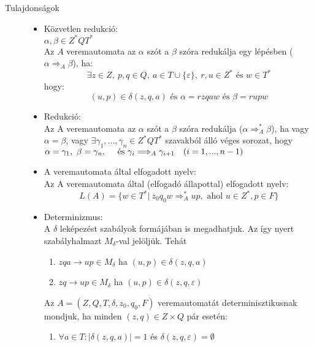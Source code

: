 \documentclass[margin=0px]{article}
\begin{document}
\begin{description}
    \item[Tulajdonságok] \hfill
        \begin{itemize}
            \item Közvetlen redukció: \\
                  $\alpha, \beta \in Z^*QT^*$\\
                  Az $A$ veremautomata az $\alpha $ szót a $\beta$ szóra redukálja egy lépésben ($\alpha \Longrightarrow_A \beta$), ha:
                  \[\exists z \in Z, \ p,q \in Q, \ a \in T \cup \{\varepsilon\}, \ r,u \in Z^* \textrm{ és } w\in T^*\]
                  hogy:
                  \[(u,p) \in \delta(z,q,a) \textrm{ és } \alpha = rzqaw \textrm{ és } \beta = rupw\]
            \item Redukció: \\
                  Az A veremautomata az $\alpha$ szót a $\beta$ szóra redukálja ($\alpha \Longrightarrow_A^* \beta$), ha vagy $\alpha = \beta$, vagy
                  $ \exists \gamma_1,...,\gamma_n \in Z^*QT^*$ szavakból álló véges sorozat, hogy $\alpha = \gamma_1, \ \beta = \gamma_n, \quad \textrm{ és } \quad \\ {\gamma_i \Longrightarrow_A \gamma_{i+1} \quad (i=1,...,n-1)}$
            \item A veremautomata által elfogadott nyelv: \\
                  Az A veremautomata által (elfogadó állapottal) elfogadott nyelv:
                  \[L(A) = \{ w \in T^* | \ z_0q_0w \Longrightarrow_A^* up, \textrm{ ahol } u \in Z^*, p \in F \} \]
            \item Determinizmus: \\
                  A $\delta$ leképezést szabályok formájában is megadhatjuk. Az így nyert szabályhalmazt $M_\delta$-val jelöljük. Tehát
                  \begin{enumerate}
                      \item $zqa \rightarrow up \in M_\delta$ ha $(u, p) \in \delta(z, q, a)$
                      \item $zq \rightarrow up \in M_\delta$ ha $(u, p) \in \delta(z, q, \varepsilon)$
                  \end{enumerate}

                  Az $A = (Z,Q, T,\delta, z_0, q_0, F)$ veremautomatát determinisztikusnak mondjuk, ha minden $(z, q) \in Z \times Q$ pár esetén:
                  \begin{enumerate}
                      \item $\forall a \in T:  |\delta(z, q, a)| = 1$ és $\delta(z, q, \varepsilon) = \emptyset$


\end{enumerate}
\end{itemize}
\end{description}
\end{document}
